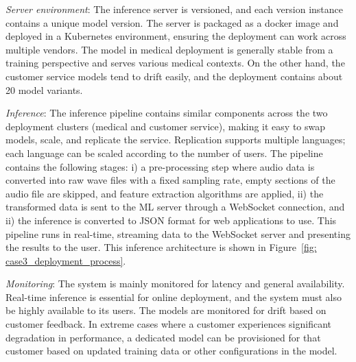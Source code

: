 \textit{Server environment}: The inference server is versioned, and each version instance contains a unique model version. The server is packaged as a docker image and deployed in a Kubernetes environment, ensuring the deployment can work across multiple vendors. The model in medical deployment is generally stable from a training perspective and serves various medical contexts. On the other hand, the customer service models tend to drift easily, and the deployment contains about 20 model variants. %

\textit{Inference}: The inference pipeline contains similar components across the two deployment clusters (medical and customer service), making it easy to swap models, scale, and replicate the service. Replication supports multiple languages; each language can be scaled according to the number of users. The pipeline contains the following stages: i) a pre-processing step where audio data is converted into raw wave files with a fixed sampling rate, empty sections of the audio file are skipped, and feature extraction algorithms are applied, ii) the transformed data is sent to the ML server through a WebSocket connection, and ii) the inference is converted to JSON format for web applications to use. This pipeline runs in real-time, streaming data to the WebSocket server and presenting the results to the user. This inference architecture is shown in Figure~\ref{fig: case3_deployment_process}.

\textit{Monitoring}: The system is mainly monitored for latency and general availability. Real-time inference is essential for online deployment, and the system must also be highly available to its users. The models are monitored for drift based on customer feedback. In extreme cases where a customer experiences significant degradation in performance, a dedicated model can be provisioned for that customer based on updated training data or other configurations in the model.
